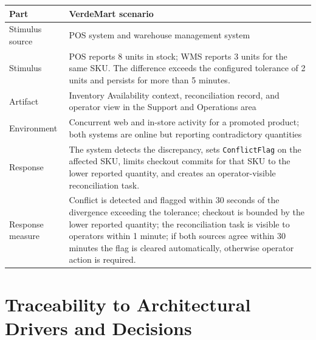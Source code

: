 \begin{center}
\begin{tabular}{|p{}|p{}|}
\hline
\textbf{Part} & \textbf{VerdeMart scenario} \\
\hline
Stimulus source & POS system and warehouse management system \\
\hline
Stimulus & POS reports 8 units in stock; WMS reports 3 units for the same SKU. The difference exceeds the configured tolerance of 2 units and persists for more than 5 minutes. \\
\hline
Artifact & Inventory Availability context, reconciliation record, and operator view in the Support and Operations area \\
\hline
Environment & Concurrent web and in-store activity for a promoted product; both systems are online but reporting contradictory quantities \\
\hline
Response & The system detects the discrepancy, sets \texttt{ConflictFlag} on the affected SKU, limits checkout commits for that SKU to the lower reported quantity, and creates an operator-visible reconciliation task. \\
\hline
Response measure & Conflict is detected and flagged within 30 seconds of the divergence exceeding the tolerance; checkout is bounded by the lower reported quantity; the reconciliation task is visible to operators within 1 minute; if both sources agree within 30 minutes the flag is cleared automatically, otherwise operator action is required. \\
\hline
\end{tabular}
\end{center}

\section{Traceability to Architectural Drivers and Decisions}

